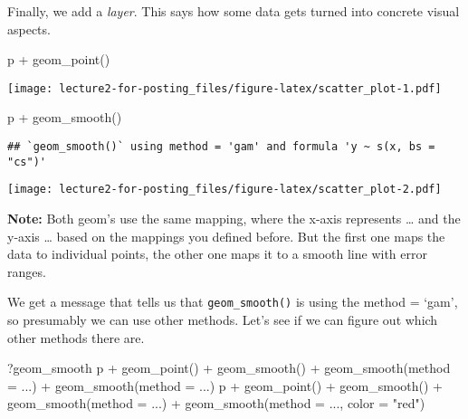 \documentclass[
]{article}
\newenvironment{Shaded}{\begin{snugshade}}{\end{snugshade}}
\newcommand{\AttributeTok}[1]{\textcolor[rgb]{0.77,0.63,0.00}{#1}}
\newcommand{\FunctionTok}[1]{\textcolor[rgb]{0.00,0.00,0.00}{#1}}
\newcommand{\NormalTok}[1]{#1}
\newcommand{\SpecialCharTok}[1]{\textcolor[rgb]{0.00,0.00,0.00}{#1}}
\newcommand{\StringTok}[1]{\textcolor[rgb]{0.31,0.60,0.02}{#1}}
\begin{document}
Finally, we add a \emph{layer}. This says how some data gets turned into
concrete visual aspects.

\begin{Shaded}
\begin{Highlighting}[]
\NormalTok{p }\SpecialCharTok{+} \FunctionTok{geom\_point}\NormalTok{()}
\end{Highlighting}
\end{Shaded}

\texttt{[image: lecture2-for-posting\_files/figure-latex/scatter\_plot-1.pdf]}

\begin{Shaded}
\begin{Highlighting}[]
\NormalTok{p }\SpecialCharTok{+} \FunctionTok{geom\_smooth}\NormalTok{()}
\end{Highlighting}
\end{Shaded}

\begin{verbatim}
## `geom_smooth()` using method = 'gam' and formula 'y ~ s(x, bs = "cs")'
\end{verbatim}

\texttt{[image: lecture2-for-posting\_files/figure-latex/scatter\_plot-2.pdf]}

\textbf{Note:} Both geom's use the same mapping, where the x-axis
represents \ldots{} and the y-axis \ldots{} based on the mappings you
defined before. But the first one maps the data to individual points,
the other one maps it to a smooth line with error ranges.

We get a message that tells us that \texttt{geom\_smooth()} is using the
method = `gam', so presumably we can use other methods. Let's see if we
can figure out which other methods there are.

\begin{Shaded}
\begin{Highlighting}[]
\NormalTok{?geom\_smooth}
\NormalTok{p }\SpecialCharTok{+} \FunctionTok{geom\_point}\NormalTok{() }\SpecialCharTok{+} \FunctionTok{geom\_smooth}\NormalTok{() }\SpecialCharTok{+} \FunctionTok{geom\_smooth}\NormalTok{(}\AttributeTok{method =}\NormalTok{ ...) }\SpecialCharTok{+} \FunctionTok{geom\_smooth}\NormalTok{(}\AttributeTok{method =}\NormalTok{ ...)}
\NormalTok{p }\SpecialCharTok{+} \FunctionTok{geom\_point}\NormalTok{() }\SpecialCharTok{+} \FunctionTok{geom\_smooth}\NormalTok{() }\SpecialCharTok{+} \FunctionTok{geom\_smooth}\NormalTok{(}\AttributeTok{method =}\NormalTok{ ...) }\SpecialCharTok{+} \FunctionTok{geom\_smooth}\NormalTok{(}\AttributeTok{method =}\NormalTok{ ..., }\AttributeTok{color =} \StringTok{"red"}\NormalTok{)}
\end{Highlighting}
\end{Shaded}
\end{document}
